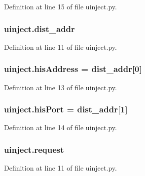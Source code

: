 Definition at line 15 of file uinject.\+py.

\subsubsection[{\texorpdfstring{dist\+\_\+addr}{dist_addr}}]{\setlength{\rightskip}{0pt plus 5cm}uinject.\+dist\+\_\+addr}\hypertarget{namespaceuinject_abe27d8465cd7ce3b80936a3096ac8b07}{}\label{namespaceuinject_abe27d8465cd7ce3b80936a3096ac8b07}


Definition at line 11 of file uinject.\+py.

\subsubsection[{\texorpdfstring{his\+Address}{hisAddress}}]{\setlength{\rightskip}{0pt plus 5cm}uinject.\+his\+Address = {\bf dist\+\_\+addr}\mbox{[}0\mbox{]}}\hypertarget{namespaceuinject_a4888af3336122d0451c4c4e3097b885b}{}\label{namespaceuinject_a4888af3336122d0451c4c4e3097b885b}


Definition at line 13 of file uinject.\+py.

\subsubsection[{\texorpdfstring{his\+Port}{hisPort}}]{\setlength{\rightskip}{0pt plus 5cm}uinject.\+his\+Port = {\bf dist\+\_\+addr}\mbox{[}1\mbox{]}}\hypertarget{namespaceuinject_ac5af8e5ca5cbe6592430915ec11a6156}{}\label{namespaceuinject_ac5af8e5ca5cbe6592430915ec11a6156}


Definition at line 14 of file uinject.\+py.

\subsubsection[{\texorpdfstring{request}{request}}]{\setlength{\rightskip}{0pt plus 5cm}uinject.\+request}\hypertarget{namespaceuinject_a022c3828ea6e0f0bb9807bfd2e77f860}{}\label{namespaceuinject_a022c3828ea6e0f0bb9807bfd2e77f860}


Definition at line 11 of file uinject.\+py.

